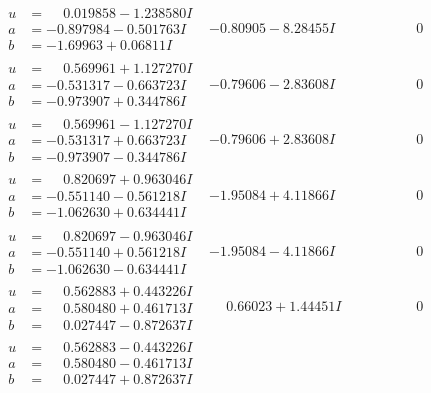 \documentclass[1p]{elsarticle_modified}
\theoremstyle{definition}
\begin{document}
$$\begin{array}{c|c|c}
\begin{aligned}
u &= \phantom{-}0.019858 - 1.238580 I \\
a &= -0.897984 - 0.501763 I \\
b &= -1.69963 + 0.06811 I\end{aligned}
 & -0.80905 - 8.28455 I & \phantom{-0.000000 } 0 \\ \hline\begin{aligned}
u &= \phantom{-}0.569961 + 1.127270 I \\
a &= -0.531317 - 0.663723 I \\
b &= -0.973907 + 0.344786 I\end{aligned}
 & -0.79606 - 2.83608 I & \phantom{-0.000000 } 0 \\ \hline\begin{aligned}
u &= \phantom{-}0.569961 - 1.127270 I \\
a &= -0.531317 + 0.663723 I \\
b &= -0.973907 - 0.344786 I\end{aligned}
 & -0.79606 + 2.83608 I & \phantom{-0.000000 } 0 \\ \hline\begin{aligned}
u &= \phantom{-}0.820697 + 0.963046 I \\
a &= -0.551140 - 0.561218 I \\
b &= -1.062630 + 0.634441 I\end{aligned}
 & -1.95084 + 4.11866 I & \phantom{-0.000000 } 0 \\ \hline\begin{aligned}
u &= \phantom{-}0.820697 - 0.963046 I \\
a &= -0.551140 + 0.561218 I \\
b &= -1.062630 - 0.634441 I\end{aligned}
 & -1.95084 - 4.11866 I & \phantom{-0.000000 } 0 \\ \hline\begin{aligned}
u &= \phantom{-}0.562883 + 0.443226 I \\
a &= \phantom{-}0.580480 + 0.461713 I \\
b &= \phantom{-}0.027447 - 0.872637 I\end{aligned}
 & \phantom{-}0.66023 + 1.44451 I & \phantom{-0.000000 } 0 \\ \hline\begin{aligned}
u &= \phantom{-}0.562883 - 0.443226 I \\
a &= \phantom{-}0.580480 - 0.461713 I \\
b &= \phantom{-}0.027447 + 0.872637 I\end{aligned}

\end{array}$$
\end{document}
